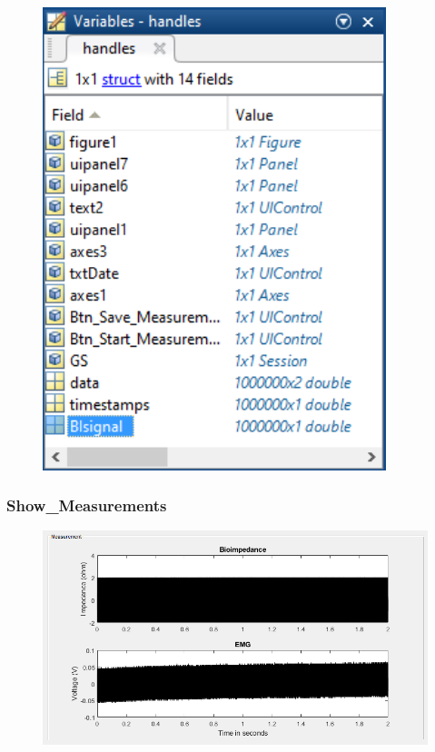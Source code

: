 \begin{figure}[H] 
\centering
{\includegraphics[width=10cm]
{Figure/modultestprocesshandles}}
\caption{}
\label{fig:modultestprocesshandles}
\end{figure}







\subsubsection{Show\_Measurements} 


\begin{figure}[H] 
\centering
{\includegraphics[width=\linewidth]
{Figure/modultestshow}}
\caption{}
\label{fig:modultestshow}
\end{figure}











